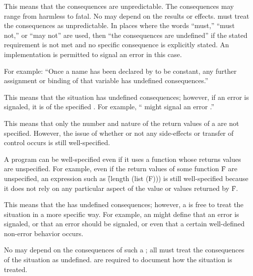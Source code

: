 
This means that the consequences are unpredictable. The consequences
may range from harmless to fatal.  No  may depend on
the results or effects.  must treat the consequences as
unpredictable.  In places where the words ``must,'' ``must not,'' or
``may not'' are used, then ``the consequences are undefined'' if the
stated requirement is not met and no specific consequence is
explicitly stated.  An implementation is permitted to signal an error
in this case.

For example: ``Once a name has been declared by 
to be constant, any further assignment or binding of that
variable has undefined consequences.''
                                               

This means that the situation has undefined consequences;
however, if an error is signaled, it is of the specified .
For example, `` might signal an error .''
                           

This means that only the number and nature of the return values of a
 are not specified.  However, the issue of whether or not
any side-effects or transfer of control occurs is still well-specified.

A program can be well-specified even if it uses a function whose
returns values are unspecified.  For example, even if the return
values of some function \f{F} are unspecified, an expression such as
\f{(length (list (F)))} is still well-specified because it does not
rely on any particular aspect of the value or values returned by \f{F}.


This means that the  has undefined consequences;
however, a  is free to treat
the situation in a more specific way.  
For example, an  might define 
    that      an error is signaled,
 or that      an error should be signaled,
 or even that a certain well-defined non-error behavior occurs.

No  may depend on the consequences of such a ;
all  must treat the consequences of the situation
as undefined.  are required to document how the
situation is treated.

